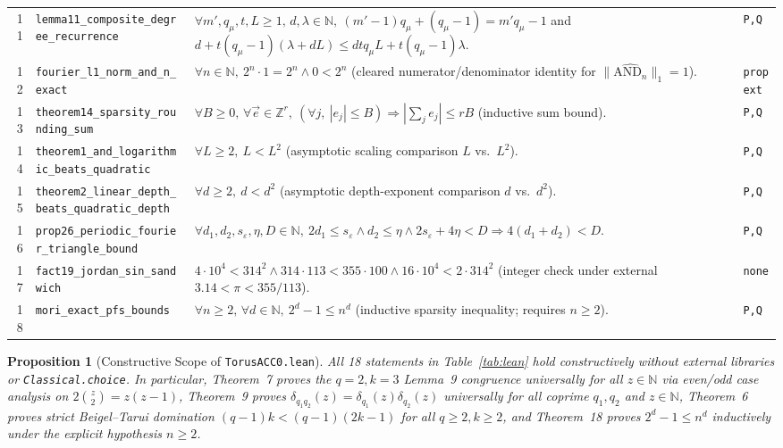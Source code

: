 \documentclass[10pt,twocolumn]{article}
\newtheorem{proposition}{Proposition}
\newcommand{\ZZ}{\mathbb{Z}}
\begin{document}
\begin{table}[t]
\begin{tabular}{@{}r l p{10.6cm} l@{}}
11 & \texttt{lemma11\_composite\_degree\_recurrence} & $\forall m',q_\mu,t,L\ge 1,\,d,\lambda\in\mathbb{N},\ (m'{-}1)q_\mu+(q_\mu{-}1)=m'q_\mu{-}1$ and $d+t(q_\mu{-}1)(\lambda+dL)\le dtq_\mu L+t(q_\mu{-}1)\lambda$. & \texttt{P,Q} \\
12 & \texttt{fourier\_l1\_norm\_and\_n\_exact} & $\forall n\in\mathbb{N},\ 2^n\cdot 1 = 2^n \wedge 0 < 2^n$ (cleared numerator/denominator identity for $\|\widehat{\mathrm{AND}_n}\|_1=1$). & \texttt{propext} \\
13 & \texttt{theorem14\_sparsity\_rounding\_sum} & $\forall B\ge 0,\,\forall \vec{e}\in\ZZ^r,\ (\forall j,\ |e_j|\le B) \Rightarrow |\sum_j e_j| \le r B$ (inductive sum bound). & \texttt{P,Q} \\
14 & \texttt{theorem1\_and\_logarithmic\_beats\_quadratic} & $\forall L\ge 2,\ L < L^2$ (asymptotic scaling comparison $L$ vs.\ $L^2$). & \texttt{P,Q} \\
15 & \texttt{theorem2\_linear\_depth\_beats\_quadratic\_depth} & $\forall d\ge 2,\ d < d^2$ (asymptotic depth-exponent comparison $d$ vs.\ $d^2$). & \texttt{P,Q} \\
16 & \texttt{prop26\_periodic\_fourier\_triangle\_bound} & $\forall d_1,d_2,s_\varepsilon,\eta,D\in\mathbb{N},\ 2d_1\le s_\varepsilon \wedge d_2\le\eta \wedge 2s_\varepsilon+4\eta<D \Rightarrow 4(d_1+d_2)<D$. & \texttt{P,Q} \\
17 & \texttt{fact19\_jordan\_sin\_sandwich} & $4\cdot 10^4 < 314^2 \wedge 314\cdot 113 < 355\cdot 100 \wedge 16\cdot 10^4 < 2\cdot 314^2$ (integer check under external $3.14<\pi<355/113$). & \texttt{none} \\
18 & \texttt{mori\_exact\_pfs\_bounds} & $\forall n\ge 2,\,\forall d\in\mathbb{N},\ 2^d - 1 \le n^d$ (inductive sparsity inequality; requires $n\ge 2$). & \texttt{P,Q} \\
\bottomrule
\end{tabular}
\end{table}

\begin{proposition}[Constructive Scope of \texttt{TorusACC0.lean}]\label{prop:lean}
\normalfont All 18 statements in Table~\ref{tab:lean} hold constructively without external libraries or \texttt{Classical.choice}. In particular, Theorem~7 proves the $q=2,k=3$ Lemma~9 congruence universally for all $z\in\mathbb{N}$ via even/odd case analysis on $2\binom{z}{2}=z(z-1)$, Theorem~9 proves $\delta_{q_1 q_2}(z)=\delta_{q_1}(z)\delta_{q_2}(z)$ universally for all coprime $q_1,q_2$ and $z\in\mathbb{N}$, Theorem~6 proves strict Beigel--Tarui domination $(q-1)k < (q-1)(2k-1)$ for all $q\ge 2, k\ge 2$, and Theorem~18 proves $2^d-1\le n^d$ inductively under the explicit hypothesis $n\ge 2$.
\end{proposition}
\end{document}
